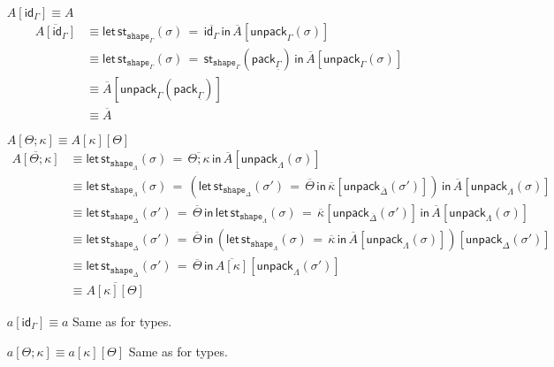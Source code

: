 \documentclass[10pt]{article}
\theoremstyle{definition}
\newcommand{\id}{\mathsf{id}}
\newcommand\StI[2]{\ensuremath{\mathsf{st}_{#1}(#2)}}
\newcommand\StE[4]{\ensuremath{\mathsf{let} \, \StI{#1}{#3} \, = \, {#2} \, \mathsf{in} \, #4}}
\newcommand\pack[1]{\ensuremath{\mathsf{pack}_{#1}}}
\newcommand\unpack[2]{\ensuremath{\mathsf{unpack}_{#1}(#2)}}
\newcommand{\tshape}[1]{\ensuremath{\mathtt{shape}_{#1}}}
\newcommand{\upstairs}[1]{\overline{#1}}
\newcommand{\downstairs}[1]{\underline{#1}}
\begin{document}
\begin{enumerate}[style = multiline, labelwidth = 80pt]
\item[{$A[\id_\Gamma] \equiv A$}] 
\begin{align*}
\upstairs{A[\id_\Gamma]}
&\equiv \StE{\tshape{\Gamma}}{\upstairs{\id_\Gamma}}{\sigma}{\upstairs{A}[\unpack{\Gamma}{\sigma}]} \\
&\equiv \StE{\tshape{\Gamma}}{\StI{\tshape{\Gamma}}{\pack{\downstairs{\Gamma}}}}{\sigma}{\upstairs{A}[\unpack{\Gamma}{\sigma}]} \\
&\equiv \upstairs{A}[\unpack{\Gamma}{\pack{\downstairs{\Gamma}}}]\\
&\equiv \upstairs{A}
\end{align*}

\item[{$A[\Theta ; \kappa] \equiv A[\kappa][\Theta]$}] 
\begin{align*}
\upstairs{A[\Theta ; \kappa]}
&\equiv \StE{\tshape{\Lambda}}{\upstairs{\Theta ; \kappa}}{\sigma}{\upstairs{A}[\unpack{\Lambda}{\sigma}]} \\
&\equiv \StE{\tshape{\Lambda}}{(\StE{\tshape{\Delta}}{\upstairs{\Theta}}{\sigma'}{\upstairs{\kappa}[\unpack{\upstairs{\Delta}}{\sigma'}]})}{\sigma}{\upstairs{A}[\unpack{\Lambda}{\sigma}]} \\
&\equiv \StE{\tshape{\Delta}}{\upstairs{\Theta}}{\sigma'}{\StE{\tshape{\Lambda}}{\upstairs{\kappa}[\unpack{\upstairs{\Delta}}{\sigma'}]}{\sigma}{\upstairs{A}[\unpack{\Lambda}{\sigma}]}} \\
&\equiv \StE{\tshape{\Delta}}{\upstairs{\Theta}}{\sigma'}{(\StE{\tshape{\Lambda}}{\upstairs{\kappa}}{\sigma}{\upstairs{A}[\unpack{\Lambda}{\sigma}]})[\unpack{\Delta}{\sigma'}]} \\
&\equiv \StE{\tshape{\Delta}}{\upstairs{\Theta}}{\sigma'}{\upstairs{A[\kappa]}[\unpack{\Lambda}{\sigma'}]} \\
&\equiv \upstairs{A[\kappa][\Theta]}
\end{align*}

\item[{$a[\id_\Gamma] \equiv a$}] Same as for types.
\item[{$a[\Theta ; \kappa] \equiv a[\kappa][\Theta]$}] Same as for types.


\end{enumerate}
\end{document}
